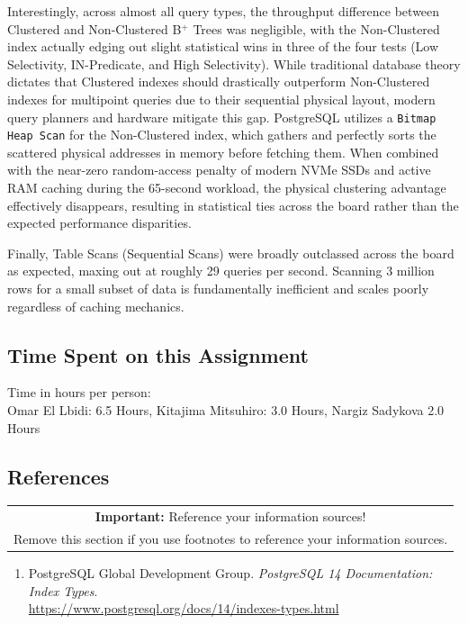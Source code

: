 \documentclass[11pt]{scrartcl}
\begin{document}
Interestingly, across almost all query types, the throughput difference between Clustered and Non-Clustered B$^+$ Trees was negligible, with the Non-Clustered index actually edging out slight statistical wins in three of the four tests (Low Selectivity, IN-Predicate, and High Selectivity). While traditional database theory dictates that Clustered indexes should drastically outperform Non-Clustered indexes for multipoint queries due to their sequential physical layout, modern query planners and hardware mitigate this gap. PostgreSQL utilizes a \texttt{Bitmap Heap Scan} for the Non-Clustered index, which gathers and perfectly sorts the scattered physical addresses in memory before fetching them. When combined with the near-zero random-access penalty of modern NVMe SSDs and active RAM caching during the 65-second workload, the physical clustering advantage effectively disappears, resulting in statistical ties across the board rather than the expected performance disparities.

Finally, Table Scans (Sequential Scans) were broadly outclassed across the board as expected, maxing out at roughly 29 queries per second. Scanning 3 million rows for a small subset of data is fundamentally inefficient and scales poorly regardless of caching mechanics.

\subsection*{Time Spent on this Assignment}

Time in hours per person: \\ 
Omar El Lbidi: 6.5 Hours, Kitajima Mitsuhiro: 3.0 Hours, Nargiz Sadykova 2.0 Hours

\subsection*{References}
\begin{table}[H]
  \centering
  \begin{tabular}{c}
    \hline
    \textbf{Important:} Reference your information sources! \tabularnewline
    Remove this section if you use footnotes to reference your information sources. \tabularnewline
    \hline
  \end{tabular}
\end{table}

\begin{enumerate}
  \item PostgreSQL Global Development Group. \textit{PostgreSQL 14 Documentation: Index Types}. \\
        \href{https://www.postgresql.org/docs/14/indexes-types.html}{https://www.postgresql.org/docs/14/indexes-types.html}
\end{enumerate}
\end{document}
